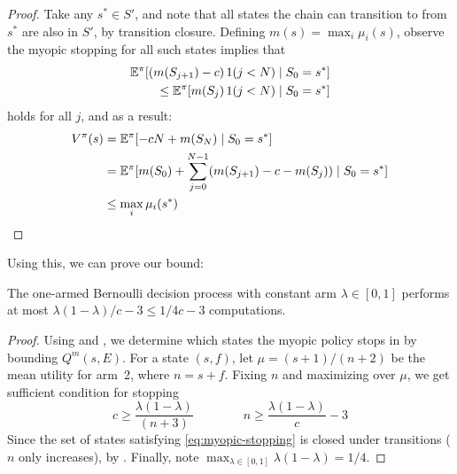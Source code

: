 \begin{hiddenproof}
	\begin{proof}
	Take any $s^*\in S'$, and note that all states the chain can transition
	to from $s^*$ are also in $S'$, by transition closure.  Defining $m(s) = \max_i\mu_i(s)$, 
	observe the myopic stopping for all such states implies that
	\begin{align*}
		\mathbb{E}^{\pi}[(m(S_{j+1}) - c)\, 1(j<N)\mid S_0=s^*] \\
		\le \mathbb{E}^{\pi}[m(S_{j})\, 1(j<N)\mid S_0=s^*]
	\end{align*}
	holds for all $j$, and as a result:
	\begin{align*}
		V^\pi(s) 
		&= \mathbb{E}^{\pi}[ - c N + m(S_N) \mid S_0=s^*] \\
		&= \mathbb{E}^{\pi}[m(S_0) + \sum_{j=0}^{N-1} (m(S_{j+1}) - c - m(S_j)) \mid S_0=s^*] \\
		&\le \max_i\mu_i(s^*) \qedhere
	\end{align*}
	\end{proof}	
\end{hiddenproof}

Using this, we can prove our bound:

\begin{thm}\label{thm:one-action-bound}
	The one-armed Bernoulli decision process with constant arm $\lambda\in[0,1]$ 
	performs at most $\lambda(1-\lambda)/c-3 \le 1/4c-3$ computations.
\end{thm}
\begin{proof}
Using  and , we determine
which states the myopic policy stops in by bounding $Q^m(s,E)$.  For a state $(s,f)$,
let $\mu=(s+1)/(n+2)$ be the mean utility for arm~2, where $n=s+f$.
Fixing $n$ and maximizing over $\mu$, we get sufficient condition for stopping
\begin{equation}
	c \ge \frac{\lambda(1-\lambda)}{(n+3)} \qquad\qquad   n\ge \frac{\lambda(1-\lambda)}{c} - 3  \label{eq:myopic-stopping}
\end{equation}
Since the set of states satisfying \eqref{eq:myopic-stopping} is closed under
transitions ($n$ only increases), by .  Finally, note $\max_{\lambda\in[0,1]} \lambda(1-\lambda)=1/4$.
\end{proof}	

